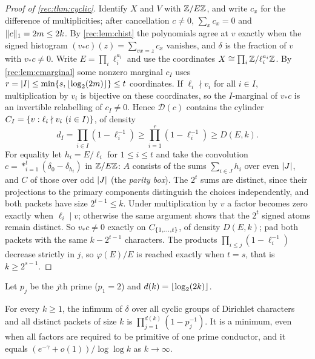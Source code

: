 \begin{proof}[Proof of \cref{rec:thm:cyclic}]
Identify $X$ and $V$ with $\mathbb{Z}/E\mathbb{Z}$, and write $c_x$ for the difference of multiplicities; after cancellation
$c\ne0$, $\sum_xc_x=0$ and $\lVert c\rVert_1=2m\le2k$. By \cref{rec:lem:chist} the polynomials agree at $v$ exactly when the
signed histogram $(v_*c)(z)=\sum_{vx=z}c_x$ vanishes, and $\delta$ is the fraction of $v$ with $v_*c\ne0$.
Write $E=\prod_i\ell_i^{a_i}$ and use the coordinates $X\cong\prod_i\mathbb{Z}/\ell_i^{a_i}\mathbb{Z}$. By \cref{rec:lem:cmarginal} some nonzero
marginal $c_I$ uses $r=\lvert I\rvert\le\min\{s,\lfloor\log_2(2m)\rfloor\}\le t$ coordinates. If $\ell_i\nmid v_i$ for all $i\in I$, multiplication
by $v_i$ is bijective on these coordinates, so the $I$-marginal of $v_*c$ is an invertible relabelling of $c_I\ne0$.
Hence $\mathcal D(c)$ contains the cylinder $C_I=\{v:\ell_i\nmid v_i\ (i\in I)\}$, of density
\[
 d_I=\prod_{i\in I}(1-\ell_i^{-1})\ge\prod_{i=1}^r(1-\ell_i^{-1})\ge D(E,k).
\]
For equality let $h_i=E/\ell_i$ for $1\le i\le t$ and take the convolution $c=\mathop{*}_{i=1}^t(\delta_0-\delta_{h_i})$ in $\mathbb{Z}/E\mathbb{Z}$: $A$
consists of the sums $\sum_{i\in J}h_i$ over even $\lvert J\rvert$, and $C$ of those over odd $\lvert J\rvert$ (the \emph{parity box}). The
$2^t$ sums are distinct, since their projections to the primary components distinguish the choices
independently, and both packets have size $2^{t-1}\le k$. Under multiplication by $v$ a factor becomes zero
exactly when $\ell_i\mid v$; otherwise the same argument shows that the $2^t$ signed atoms remain distinct. So
$v_*c\ne0$ exactly on $C_{\{1,\dots,t\}}$, of density $D(E,k)$; pad both packets with the same $k-2^{t-1}$ characters.
The products $\prod_{i\le j}(1-\ell_i^{-1})$ decrease strictly in $j$, so $\varphi(E)/E$ is reached exactly when $t=s$, that is
$k\ge2^{s-1}$.
\end{proof}

Let $p_j$ be the $j$th prime ($p_1=2$) and $d(k)=\lfloor\log_2(2k)\rfloor$.

\begin{corollary}\label{rec:cor:cglobal}
For every $k\ge1$, the infimum of $\delta$ over all cyclic groups of Dirichlet characters and all distinct
packets of size $k$ is $\prod_{j=1}^{d(k)}(1-p_j^{-1})$. It is a minimum, even when all factors are required to be
primitive of one prime conductor, and it equals $(e^{-\gamma}+o(1))/\log\log k$ as $k\to\infty$.
\end{corollary}

